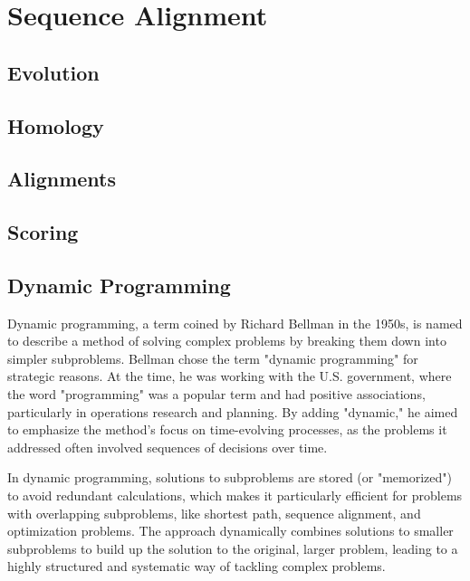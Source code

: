 \chapter{Sequence Alignment}
\label{ch:alignment}

\section{Evolution}

\section{Homology}

\section{Alignments}

\section{Scoring}

\section{Dynamic Programming}

Dynamic programming, a term coined by Richard Bellman in the 1950s,
is named to describe a method of solving complex problems by breaking them down into simpler subproblems. Bellman chose the term "dynamic programming" for strategic reasons. At the time, he was working with the U.S. government, where the word "programming" was a popular term and had positive associations, particularly in operations research and planning. By adding "dynamic," he aimed to emphasize the method's focus on time-evolving processes, as the problems it addressed often involved sequences of decisions over time.

In dynamic programming, solutions to subproblems are stored (or "memorized") to avoid redundant calculations, which makes it particularly efficient for problems with overlapping subproblems, like shortest path, sequence alignment, and optimization problems. The approach dynamically combines solutions to smaller subproblems to build up the solution to the original, larger problem, leading to a highly structured and systematic way of tackling complex problems.

